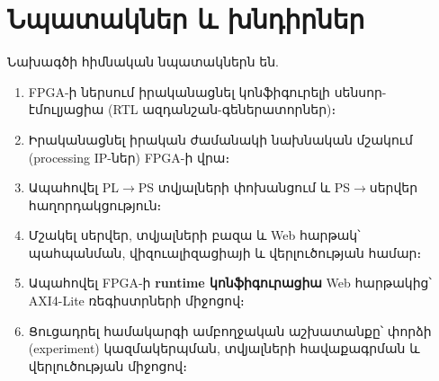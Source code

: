 \chapter{Նպատակներ և խնդիրներ}

Նախագծի հիմնական նպատակներն են.
\begin{enumerate}[leftmargin=1.6em]
  \item FPGA-ի ներսում իրականացնել կոնֆիգուրելի սենսոր-էմուլյացիա (RTL ազդանշան-գեներատորներ)։
  \item Իրականացնել իրական ժամանակի նախնական մշակում (processing IP-ներ) FPGA-ի վրա։
  \item Ապահովել PL$\rightarrow$PS տվյալների փոխանցում և PS$\rightarrow$սերվեր հաղորդակցություն։
  \item Մշակել սերվեր, տվյալների բազա և Web հարթակ՝ պահպանման, վիզուալիզացիայի և վերլուծության համար։
  \item Ապահովել FPGA-ի \textbf{runtime կոնֆիգուրացիա} Web հարթակից՝ AXI4-Lite ռեգիստրների միջոցով։
  \item Ցուցադրել համակարգի ամբողջական աշխատանքը՝ փորձի (experiment) կազմակերպման, տվյալների հավաքագրման և վերլուծության միջոցով։
\end{enumerate}
